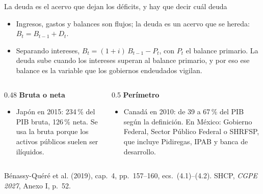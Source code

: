 \documentclass[aspectratio=169,11pt]{beamer}
\newcommand{\fuente}[1]{\par\vfill{\small\color{cGris}#1\par}}
\newcommand{\BQ}{Bénassy-Quéré et al. (2019), cap.~4}
\begin{document}
\begin{frame}{La deuda es el acervo que dejan los déficits, y hay que decir cuál deuda}
  \begin{itemize}
    \item Ingresos, gastos y balances son flujos; la deuda es un acervo que se hereda: $B_t = B_{t-1} + D_t$.
    \item Separando intereses, $B_t = (1+i)\,B_{t-1} - P_t$, con $P_t$ el balance primario. La deuda sube cuando los intereses superan al balance primario, y por eso ese balance es la variable que los gobiernos endeudados vigilan.
  \end{itemize}
  \pause
  \begin{columns}[T]
    \begin{column}{0.48\textwidth}
      \textbf{Bruta o neta}
      \begin{itemize}
        \item Japón en 2015: 234\,\% del PIB bruta, 126\,\% neta. Se usa la bruta porque los activos públicos suelen ser ilíquidos.
      \end{itemize}
    \end{column}
    \begin{column}{0.5\textwidth}
      \textbf{Perímetro}
      \begin{itemize}
        \item Canadá en 2010: de 39 a 67\,\% del PIB según la definición. En México: Gobierno Federal, Sector Público Federal o SHRFSP, que incluye Pidiregas, IPAB y banca de desarrollo.
      \end{itemize}
    \end{column}
  \end{columns}
  \fuente{\BQ, pp.~157--160, ecs.~(4.1)--(4.2). SHCP, \emph{CGPE 2027}, Anexo I, p.~52.}
\end{frame}
\end{document}
